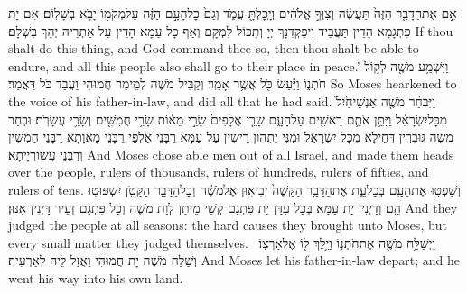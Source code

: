 {אִ֣ם אֶת\maqqaf הַדָּבָ֤ר הַזֶּה֙ תַּעֲשֶׂ֔ה וְצִוְּךָ֣ אֱלֹהִ֔ים וְיָֽכׇלְתָּ֖ עֲמֹ֑ד וְגַם֙ כׇּל\maqqaf הָעָ֣ם הַזֶּ֔ה עַל\maqqaf מְקֹמ֖וֹ יָבֹ֥א בְשָׁלֽוֹם׃}
{אִם יָת פִּתְגָמָא הָדֵין תַּעֲבֵיד וִיפַקְּדִנָּךְ יְיָ וְתִכּוֹל לִמְקָם וְאַף כָּל עַמָּא הָדֵין עַל אַתְרֵיהּ יְהָךְ בִּשְׁלָם׃}
{If thou shalt do this thing, and God command thee so, then thou shalt be able to endure, and all this people also shall go to their place in peace.’}{}
{וַיִּשְׁמַ֥ע מֹשֶׁ֖ה לְק֣וֹל חֹתְנ֑וֹ וַיַּ֕עַשׂ כֹּ֖ל אֲשֶׁ֥ר אָמָֽר׃}
{וְקַבֵּיל מֹשֶׁה לְמֵימַר חֲמוּהִי וַעֲבַד כֹּל דַּאֲמַר׃}
{So Moses hearkened to the voice of his father-in-law, and did all that he had said.}{}
{וַיִּבְחַ֨ר מֹשֶׁ֤ה אַנְשֵׁי\maqqaf חַ֙יִל֙ מִכׇּל\maqqaf יִשְׂרָאֵ֔ל וַיִּתֵּ֥ן אֹתָ֛ם רָאשִׁ֖ים עַל\maqqaf הָעָ֑ם שָׂרֵ֤י אֲלָפִים֙ שָׂרֵ֣י מֵא֔וֹת שָׂרֵ֥י חֲמִשִּׁ֖ים וְשָׂרֵ֥י עֲשָׂרֹֽת׃}
{וּבְחַר מֹשֶׁה גּוּבְרִין דְּחֵילָא מִכָּל יִשְׂרָאֵל וּמַנִּי יָתְהוֹן רֵישִׁין עַל עַמָּא רַבָּנֵי אַלְפֵי רַבָּנֵי מָאוָתָא רַבָּנֵי חַמְשִׁין וְרַבָּנֵי עֲשׂוֹרְיָיתָא׃}
{And Moses chose able men out of all Israel, and made them heads over the people, rulers of thousands, rulers of hundreds, rulers of fifties, and rulers of tens.}{}
{וְשָׁפְט֥וּ אֶת\maqqaf הָעָ֖ם בְּכׇל\maqqaf עֵ֑ת אֶת\maqqaf הַדָּבָ֤ר הַקָּשֶׁה֙ יְבִיא֣וּן אֶל\maqqaf מֹשֶׁ֔ה וְכׇל\maqqaf הַדָּבָ֥ר הַקָּטֹ֖ן יִשְׁפּוּט֥וּ הֵֽם׃}
{וְדָיְנִין יָת עַמָּא בְּכָל עִדָּן יָת פִּתְגָם קְשֵׁי מֵיתַן לְוָת מֹשֶׁה וְכָל פִּתְגָם זְעֵיר דָּיְנִין אִנּוּן׃}
{And they judged the people at all seasons: the hard causes they brought unto Moses, but every small matter they judged themselves.}{}
{וַיְשַׁלַּ֥ח מֹשֶׁ֖ה אֶת\maqqaf חֹתְנ֑וֹ וַיֵּ֥לֶךְ ל֖וֹ אֶל\maqqaf אַרְצֽוֹ׃ \petucha }
{וְשַׁלַּח מֹשֶׁה יָת חֲמוּהִי וַאֲזַל לֵיהּ לְאַרְעֵיהּ׃}
{And Moses let his father-in-law depart; and he went his way into his own land.}{}
